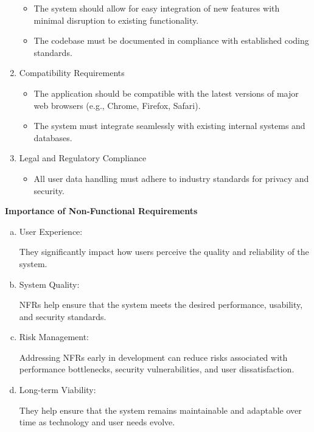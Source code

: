 \documentclass[a4paper]{article}
\begin{document}
\begin{enumerate}
\begin{itemize}
        \item The system should allow for easy integration of new features with minimal disruption to existing functionality.
        \item The codebase must be documented in compliance with established coding standards.
\end{itemize}
        \item Compatibility Requirements

\begin{itemize}
        \item The application should be compatible with the latest versions of major web browsers (e.g., Chrome, Firefox, Safari).
        \item The system must integrate seamlessly with existing internal systems and databases.
\end{itemize}
        \item Legal and Regulatory Compliance
\begin{itemize}
        \item All user data handling must adhere to industry standards for privacy and security.
\end{itemize}
\end{enumerate}
\textbf{Importance of Non-Functional Requirements}
\begin{enumerate}[(a).]
        \item User Experience:

            They significantly impact how users perceive the quality and reliability of the system.

        \item System Quality:

            NFRs help ensure that the system meets the desired performance, usability, and security standards.

        \item Risk Management:

            Addressing NFRs early in development can reduce risks associated with performance bottlenecks, security vulnerabilities, and
            user dissatisfaction.

        \item Long-term Viability:

            They help ensure that the system remains maintainable and adaptable over time as technology and user needs evolve.

\end {enumerate}
\end{document}
